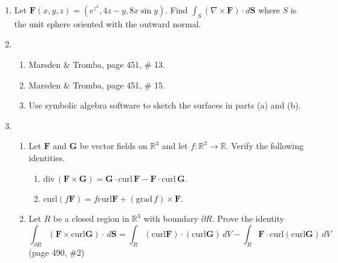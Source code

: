 \documentclass{article}
\newcommand{\divt}{\text{div} \,}
\begin{document}
\begin{enumerate}
\begin{enumerate}
    \end{enumerate}
    
    \newpage
    \item Let $\boldsymbol F (x,y,z) = (e^{z^2}, 4z-y, 8x \sin y)$. Find $\displaystyle \int_S (\nabla \times \boldsymbol F)\cdot d\boldsymbol S$ where $S$ is the unit sphere oriented with the outward normal.

    \newpage
    \item 
    \begin{enumerate}
        \item Marsden \& Tromba, page 451, \# 13.
        \item Marsden \& Tromba, page 451, \# 15.
        \item Use symbolic algebra software to sketch the surfaces in parts (a) and (b).
    \end{enumerate}
    
    \newpage
    \item 
    \begin{enumerate}
        \item Let $\boldsymbol F$ and $\boldsymbol G$ be vector fields on $\mathbb{R}^3$ and let $f : \mathbb{R}^3 \rightarrow \mathbb{R}$. Verify the following identities.
        \begin{enumerate}[label=(\roman*)]
            \item $\divt (\boldsymbol F \times \boldsymbol G) = \boldsymbol G \cdot \text{curl} \, \boldsymbol F - \boldsymbol F \cdot \text{curl} \, \boldsymbol G.$
            \item curl$(f \boldsymbol F) = f \text{curl} \boldsymbol F + (\text{grad}\, f) \times \boldsymbol F$.
        \end{enumerate}
        \item Let $R$ be a closed region in $\mathbb{R}^3$ with boundary $\partial R$. Prove the identity
        \[\int_{\partial R} ( \boldsymbol F \times \text{curl} \boldsymbol G) \cdot \, d \boldsymbol S = \int_R(\text{curl} \boldsymbol F ) \cdot (\text{curl} \boldsymbol G) \, dV - \int_R \boldsymbol F \cdot \text{curl}(\text{curl} \boldsymbol G ) \, dV\]
        (page 490, \#2)
    \end{enumerate}
\end{enumerate}
\end{document}
